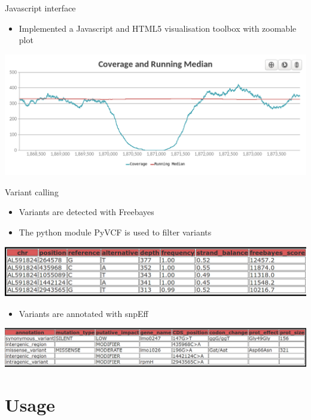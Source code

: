\documentclass{beamer}
\begin{document}
\begin{frame}{Javascript interface}
    \begin{itemize}
        \item Implemented a Javascript and HTML5 visualisation toolbox with zoomable plot
    \end{itemize}
    \includegraphics[scale=0.28]{images/js_graphic}
\end{frame}

\begin{frame}{Variant calling}
    \begin{itemize}
        \item Variants are detected with Freebayes
        \item The python module PyVCF is used to filter variants
    \end{itemize}
    \includegraphics[scale=0.23]{images/freebayes}
    \begin{itemize}
        \item Variants are annotated with snpEff
    \end{itemize}
    \includegraphics[scale=0.18]{images/snpeff}
\end{frame}

\section{Usage}
\end{document}
